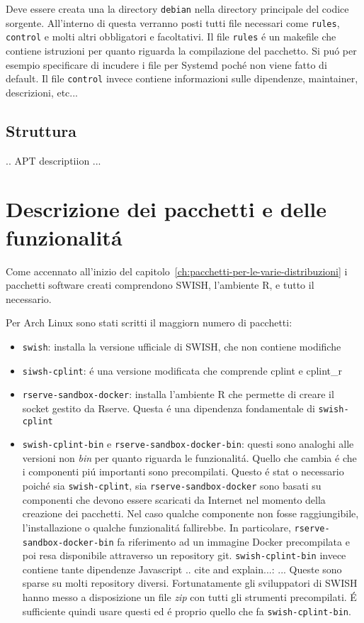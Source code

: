 \documentclass[10pt,titlepage,twoside,a4paper]{report}
\begin{document}
Deve essere creata una la directory \texttt{debian} nella directory principale 
del codice sorgente. All'interno di questa verranno posti tutti file 
necessari come \texttt{rules}, \texttt{control} e molti altri obbligatori e 
facoltativi. Il file \texttt{rules} \'e un makefile che contiene istruzioni per 
quanto riguarda la compilazione del pacchetto. Si pu\'o per esempio specificare 
di incudere i file per Systemd poch\'e non viene fatto di default. Il file 
\texttt{control} invece contiene informazioni sulle dipendenze, maintainer, 
descrizioni, etc... 

\subsection{Struttura}
.. APT descriptiion ...

\section{Descrizione dei pacchetti e delle funzionalit\'a}
Come accennato all'inizio del capitolo~\ref{ch:pacchetti-per-le-varie-distribuzioni}
i pacchetti software creati comprendono SWISH, l'ambiente R, e tutto il 
necessario.

Per Arch Linux sono stati scritti il maggiorn numero di pacchetti:
\begin{itemize}
    \item \texttt{swish}: installa la versione ufficiale di SWISH, che non 
contiene modifiche
    \item \texttt{siwsh-cplint}: \'e una versione modificata che comprende 
cplint e cplint\_r
    \item \texttt{rserve-sandbox-docker}: installa l'ambiente R che permette di 
creare il socket gestito da Rserve. Questa \'e una dipendenza fondamentale di 
\texttt{swish-cplint}
    \item \texttt{swish-cplint-bin} e \texttt{rserve-sandbox-docker-bin}: 
questi sono analoghi alle versioni non \emph{bin} per quanto riguarda le 
funzionalit\'a. Quello che cambia \'e che i componenti pi\'u importanti sono 
precompilati. Questo \'e stat o necessario poich\'e sia \texttt{swish-cplint}, 
sia \texttt{rserve-sandbox-docker} sono basati su componenti che devono essere 
scaricati da Internet nel momento della creazione dei pacchetti. Nel caso 
qualche componente non fosse raggiungibile, l'installazione o qualche 
funzionalit\'a fallirebbe. In particolare, \texttt{rserve-sandbox-docker-bin} 
fa riferimento ad un immagine Docker precompilata e poi resa disponibile 
attraverso un repository git. \texttt{swish-cplint-bin} invece contiene tante 
dipendenze Javascript\cite{javascriptDepsSWISH} .. cite and explain...:
...
Queste sono sparse su molti repository diversi. Fortunatamente gli sviluppatori 
di SWISH hanno messo a disposizione un file \emph{zip} con tutti gli strumenti 
precompilati. \'E sufficiente quindi usare questi ed \'e proprio quello che fa 
\texttt{swish-cplint-bin}.
\end{itemize}
\end{document}

